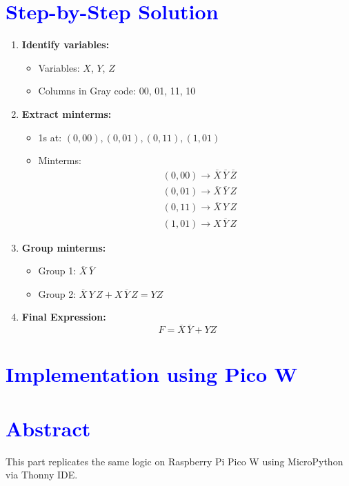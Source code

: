 \documentclass[twocolumn]{article}
\begin{document}
\section*{\textcolor{blue}{Step-by-Step Solution}}
\begin{enumerate}
    \item \textbf{Identify variables:}
    \begin{itemize}
        \item Variables: $X$, $Y$, $Z$
        \item Columns in Gray code: 00, 01, 11, 10
    \end{itemize}

    \item \textbf{Extract minterms:}
    \begin{itemize}
        \item 1s at: $(0,00), (0,01), (0,11), (1,01)$
        \item Minterms:
        \begin{align*}
            & (0,00) \rightarrow \overline{X}\,\overline{Y}\,\overline{Z} \\
            & (0,01) \rightarrow \overline{X}\,\overline{Y}\,Z \\
            & (0,11) \rightarrow \overline{X}\,Y\,Z \\
            & (1,01) \rightarrow X\,\overline{Y}\,Z
        \end{align*}
    \end{itemize}

    \item \textbf{Group minterms:}
    \begin{itemize}
        \item Group 1: $\overline{X}\,\overline{Y}$
        \item Group 2: $\overline{X}\,Y\,Z + X\,\overline{Y}\,Z = YZ$
    \end{itemize}

    \item \textbf{Final Expression:}
    \[
        F = \overline{X}\,\overline{Y} + YZ
    \]
\end{enumerate}
\vspace{-2.5em}
\section*{\textcolor{blue}{Implementation using Pico W}}

\section*{\textcolor{blue}{Abstract}}
This part replicates the same logic on Raspberry Pi Pico W using MicroPython via Thonny IDE.
\end{document}
